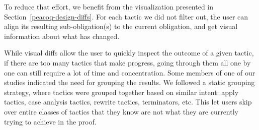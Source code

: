 To reduce that effort, we benefit from the visualization presented in
Section~\ref{peacoq-design-diffs}.  For each tactic we did not filter out, the
user can align its resulting sub-obligation(s) to the current obligation, and
get visual information about what has changed.

While visual diffs allow the user to quickly inspect the outcome of a given
tactic, if there are too many tactics that make progress, going through them all
one by one can still require a lot of time and concentration.  Some members of
one of our studies indicated the need for grouping the results.  We followed a
static grouping strategy, where tactics were grouped together based on similar
intent: apply tactics, case analysis tactics, rewrite tactics, terminators, etc.
This let users skip over entire classes of tactics that they know are not what
they are currently trying to achieve in the proof.
